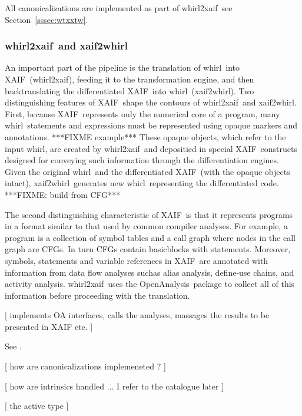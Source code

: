 \documentclass[acmtocl,acmnow]{acmtrans2m}
\newcommand{\basicblock}{basicblock}
\newcommand{\OpenAnalysis}{OpenAnalysis}
\newcommand{\xaif}{XAIF}
\newcommand{\whirl}{whirl}
\newcommand{\whirlToxaif}{whirl2xaif}
\newcommand{\xaifTowhirl}{xaif2whirl}
\newcommand{\refsec}[1]{Section~\ref{#1}}
\begin{document}
All canonicalizations are implemented as part of \whirlToxaif\, see 
\refsec{sssec:wtxxtw}.

\subsubsection*{\whirlToxaif\ and \xaifTowhirl} \label{sssec:wtxxtw}

An important part of the pipeline is the  translation of \whirl\ into \xaif\
(\whirlToxaif), feeding it to the transformation engine, and then
backtranslating the differentiated \xaif\ into \whirl\ (\xaifTowhirl).
Two distinguishing features of \xaif\ shape the contours of \whirlToxaif\ 
and \xaifTowhirl.  
First, because \xaif\ represents only the numerical
core of a program, many \whirl\ statements and expressions must be
represented using opaque markers and annotations.  
{\color{Red} ***FIXME example*** } 
These opaque objects, which refer to the input \whirl, are created by
\whirlToxaif\ and depositied in special \xaif\ constructs designed for
conveying such information through the differentiation engines.  Given
the original \whirl\ and the differentiated \xaif\ (with the opaque
objects intact), \xaifTowhirl\ generates new \whirl\ representing the
differentiated code. {\color {Red} ***FIXME: build from CFG***}

The second distinguishing characteristic of \xaif\ is that it represents
programs in a format 
similar to that used by  common compiler analyses.  
For example, a program is a
collection of symbol tables and a call graph where nodes in the call
graph are CFGs. In turn CFGs contain {\basicblock}s with 
statements.  
Moreover, symbols, statements and variable
references in \xaif\ are annotated with information from data flow
analyses suchas alias analysis, define-use chains, and activity
analysis.  \whirlToxaif\ uses the \OpenAnalysis\  package to
collect all of this information before proceeding with the
translation.

{\color{Red} [ implements OA interfaces, calls the analyses, 
	massages the results to be presented in XAIF etc. ] }

See \cite{RiceTechreport}.

{\color{Red} [ how are canonicalizations implemeneted ?  ] }


{\color{Red} [ how are intrinsics handled ... I refer to the catalogue later  ] }


{\color{Red} [ the active type  ] }
\end{document}
